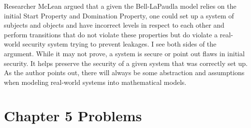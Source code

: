 \documentclass[journal,onecolumn]{IEEEtran}
\begin{document}
Researcher McLean argued that a given the Bell-LaPaudla model relies on the initial Start Property and Domination Property, one could set up a system of subjects and objects and have incorrect levels in respect to each other and perform transitions that do not violate these properties but do violate a real-world security system trying to prevent leakages. I see both sides of the argument. While it may not prove, a system is secure or point out flaws in initial security. It helps preserve the security of a given system that was correctly set up. As the author points out, there will always be some abstraction and assumptions when modeling real-world systems into mathematical models.

\section{Chapter 5 Problems}
\end{document}
